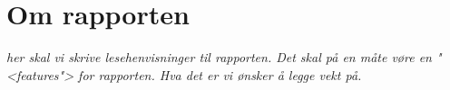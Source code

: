 \section{Om rapporten}
\emph{her skal vi skrive lesehenvisninger til rapporten. Det skal på en måte vøre en "<features"> for rapporten. Hva det er vi ønsker å legge vekt på.}